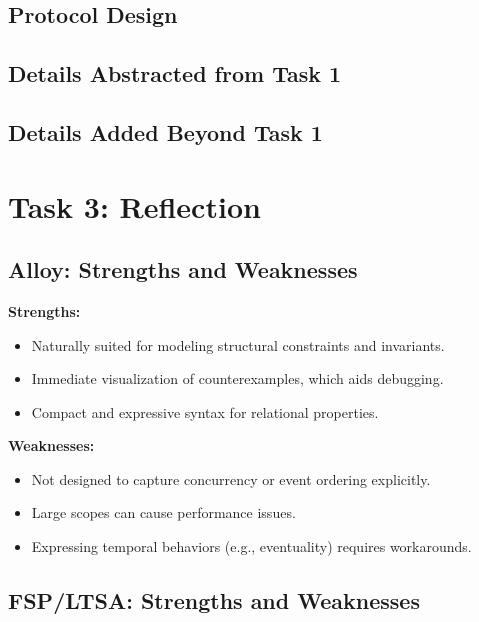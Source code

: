 \documentclass[11pt]{article}
\begin{document}
\subsection{Protocol Design}


\subsection{Details Abstracted from Task 1}


\subsection{Details Added Beyond Task 1}


\section{Task 3: Reflection}
\label{sec:task3}

\subsection{Alloy: Strengths and Weaknesses}

\textbf{Strengths:}
\begin{itemize}[leftmargin=1.5em]
  \item Naturally suited for modeling structural constraints and invariants.
  \item Immediate visualization of counterexamples, which aids debugging.
  \item Compact and expressive syntax for relational properties.
\end{itemize}
\textbf{Weaknesses:}
\begin{itemize}[leftmargin=1.5em]
  \item Not designed to capture concurrency or event ordering explicitly.
  \item Large scopes can cause performance issues.
  \item Expressing temporal behaviors (e.g., eventuality) requires workarounds.
\end{itemize}

\subsection{FSP/LTSA: Strengths and Weaknesses}
\end{document}
